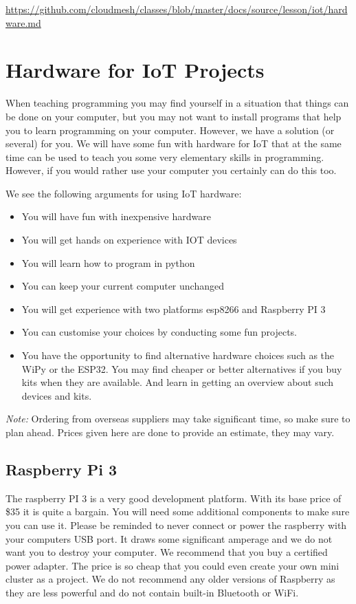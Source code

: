 \begin{fileremark}\url{https://github.com/cloudmesh/classes/blob/master/docs/source/lesson/iot/hardware.md}\end{fileremark}
\section{Hardware for IoT Projects}\label{hardware-for-iot-projects}

When teaching programming you may find yourself in a situation that
things can be done on your computer, but you may not want to install
programs that help you to learn programming on your computer. However,
we have a solution (or several) for you. We will have some fun with
hardware for IoT that at the same time can be used to teach you some
very elementary skills in programming. However, if you would rather use
your computer you certainly can do this too.

We see the following arguments for using IoT hardware:

\begin{itemize}
\tightlist
\item
  You will have fun with inexpensive hardware
\item
  You will get hands on experience with IOT devices
\item
  You will learn how to program in python
\item
  You can keep your current computer unchanged
\item
  You will get experience with two platforms esp8266 and Raspberry PI 3
\item
  You can customise your choices by conducting some fun projects.
\item
  You have the opportunity to find alternative hardware choices such as
  the WiPy or the ESP32. You may find cheaper or better alternatives if
  you buy kits when they are available. And learn in getting an overview
  about such devices and kits.
\end{itemize}

\emph{Note:} Ordering from overseas suppliers may take significant time,
so make sure to plan ahead. Prices given here are done to provide an
estimate, they may vary.

\subsection{Raspberry Pi 3}\label{raspberry-pi-3}

The raspberry PI 3 is a very good development platform. With its base
price of \$35 it is quite a bargain. You will need some additional
components to make sure you can use it. Please be reminded to never
connect or power the raspberry with your computers USB port. It draws
some significant amperage and we do not want you to destroy your
computer. We recommend that you buy a certified power adapter. The price
is so cheap that you could even create your own mini cluster as a
project. We do not recommend any older versions of Raspberry as they are
less powerful and do not contain built-in Bluetooth or WiFi.

